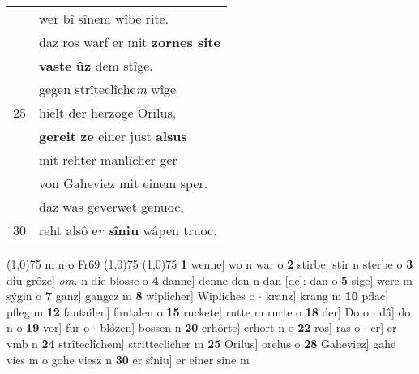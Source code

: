 \documentclass[8pt,a4paper,notitlepage]{article}
\begin{document}
\begin{table}[ht]
\begin{minipage}[t]{0.5\linewidth}
\begin{tabular}{rl}
 & wer bî sînem wîbe rite.\\ 
 & daz ros warf er mit \textbf{zornes site}\\ 
 & \textbf{vaste} \textbf{ûz} dem stîge.\\ 
 & gegen strîteclîche\textit{m} wîge\\ 
25 & hielt der herzoge Orilus,\\ 
 & \textbf{gereit} \textbf{ze} einer just \textbf{alsus}\\ 
 & mit rehter manlîcher ger\\ 
 & von Gaheviez mit einem sper.\\ 
 & daz was geverwet genuoc,\\ 
30 & reht alsô e\textit{r} \textbf{\textit{s}îniu} wâpen truoc.\\ 
\end{tabular}
\scriptsize
\line(1,0){75} \newline
m n o Fr69 \newline
\line(1,0){75} \newline
\newline
\line(1,0){75} \newline
\textbf{1} wenne] wo n war o \textbf{2} stirbe] stir n sterbe o \textbf{3} diu grôze] \textit{om.} n die blosse o \textbf{4} danne] denne den n dan [de]: dan o \textbf{5} sige] were m sẏgin o \textbf{7} ganz] gangcz m \textbf{8} wîplîcher] Wipliches o  $\cdot$ kranz] krang m \textbf{10} pflac] pfleg m \textbf{12} fantailen] fantalen o \textbf{15} ruckete] rutte m rurte o \textbf{18} der] Do o  $\cdot$ dâ] do n o \textbf{19} vor] fur o  $\cdot$ blôzen] bossen n \textbf{20} erhôrte] erhort n o \textbf{22} ros] ras o  $\cdot$ er] er vmb n \textbf{24} strîteclîchem] stritteclicher m \textbf{25} Orilus] orelus o \textbf{28} Gaheviez] gahe vies m o gohe viesz n \textbf{30} er sîniu] er einer sine m \newline
\end{minipage}
\end{table}
\newpage
\end{document}
